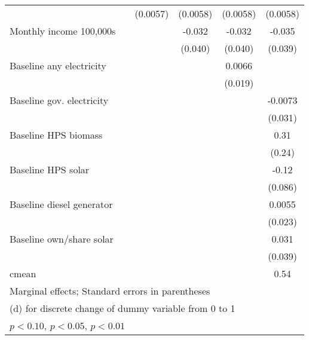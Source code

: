 \begin{table}[htbp]
\begin{tabular*}{1\hsize}{@{\hskip\tabcolsep\extracolsep\fill}l*{5}{c}}
                &                  & (0.0057)         & (0.0058)         & (0.0058)         & (0.0058)         \\
Monthly income 100,000s&                  &                  &   -0.032         &   -0.032         &   -0.035         \\
                &                  &                  &  (0.040)         &  (0.040)         &  (0.039)         \\
Baseline any electricity&                  &                  &                  &   0.0066         &                  \\
                &                  &                  &                  &  (0.019)         &                  \\
Baseline gov. electricity&                  &                  &                  &                  &  -0.0073         \\
                &                  &                  &                  &                  &  (0.031)         \\
Baseline HPS biomass&                  &                  &                  &                  &     0.31         \\
                &                  &                  &                  &                  &   (0.24)         \\
Baseline HPS solar&                  &                  &                  &                  &    -0.12         \\
                &                  &                  &                  &                  &  (0.086)         \\
Baseline diesel generator&                  &                  &                  &                  &   0.0055         \\
                &                  &                  &                  &                  &  (0.023)         \\
Baseline own/share solar&                  &                  &                  &                  &    0.031         \\
                &                  &                  &                  &                  &  (0.039)         \\
\midrule
cmean           &                  &                  &                  &                  &     0.54         \\
\bottomrule
\multicolumn{6}{l}{\footnotesize Marginal effects; Standard errors in parentheses}\\
\multicolumn{6}{l}{\footnotesize  (d) for discrete change of dummy variable from 0 to 1}\\
\multicolumn{6}{l}{\footnotesize \sym{*} \(p<0.10\), \sym{**} \(p<0.05\), \sym{***} \(p<0.01\)}\\
\end{tabular*}
\end{table}

